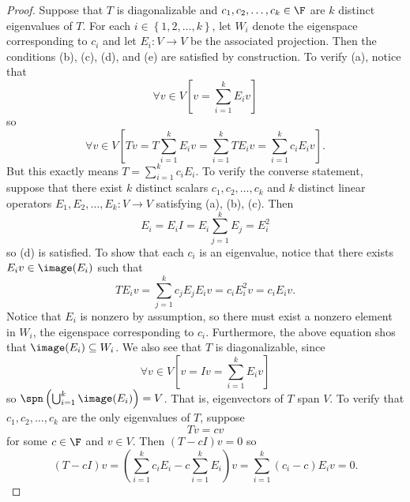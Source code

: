 \documentclass[linearalgebraII]{subfiles}
\begin{document}
    \begin{proof}
        Suppose that $T$ is diagonalizable and $c_1, c_2, \ldots, c_k\in \F$ are $k$ distinct eigenvalues of $T$. For each $i\in \left\lbrace 1, 2, \ldots, k \right\rbrace$, let $W_i$ denote the eigenspace corresponding to $c_i$ and let $E_i:V\to V$ be the associated projection. Then the conditions (b), (c), (d), and (e) are satisfied by construction. To verify (a), notice that
        \begin{equation*}
            \forall v\in V \left[ v = \sum^{k}_{i=1} E_iv \right] 
        \end{equation*}
        so
        \begin{equation*}
            \forall v\in V \left[ Tv = T \sum^{k}_{i=1} E_iv = \sum^{k}_{i=1} TE_iv = \sum^{k}_{i=1} c_iE_iv \right].
        \end{equation*}
        But this exactly means $T = \sum^{k}_{i=1} c_iE_i$. To verify the converse statement, suppose that there exist $k$ distinct scalars $c_1, c_2, \ldots, c_k$ and $k$ distinct linear operators $E_1, E_2, \ldots, E_k:V\to V$ satisfying (a), (b), (c). Then
        \begin{equation*}
            E_i = E_iI = E_i \sum^{k}_{j=1} E_j = E_i^2
        \end{equation*} 
        so (d) is satisfied. To show that each $c_i$ is an eigenvalue, notice that there exists $E_iv\in \image(E_i)$ such that
        \begin{equation*}
            TE_iv = \sum^{k}_{j=1} c_jE_jE_iv = c_iE_i^2v = c_iE_iv.
        \end{equation*}
        Notice that $E_i$ is nonzero by assumption, so there must exist a nonzero element in $W_i$, the eigenspace corresponding to $c_i$. Furthermore, the above equation shos that $\image(E_i)\subseteq W_i$. We also see that $T$ is diagonalizable, since
        \begin{equation*}
            \forall v\in V \left[ v = Iv = \sum^{k}_{i=1} E_iv \right] 
        \end{equation*}
        so $\spn \left( \bigcup^{k}_{i=1} \image(E_i) \right) = V$. That is, eigenvectors of $T$ span $V$. To verify that $c_1, c_2, \ldots, c_k$ are the only eigenvalues of $T$, suppose
        \begin{equation*}
            Tv = cv
        \end{equation*}
        for some $c\in \F$ and $v\in V$. Then $(T-cI)v = 0$ so
        \begin{equation*}
            (T-cI)v = \left( \sum^{k}_{i=1} c_iE_i - c \sum^{k}_{i=1} E_i \right) v = \sum^{k}_{i=1} (c_i-c) E_iv = 0.

\end{equation*}
\end{proof}
\end{document}
